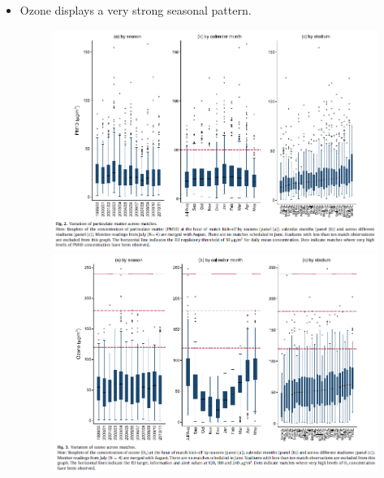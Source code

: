 \documentclass[../root]{subfiles}
\begin{document}
\begin{itemize}
\begin{itemize}
\begin{itemize}
          \item stadium-specific trends: reflects population size and density as well as the degree of industrialization.
          \item The critical value of concentration of \SI{50}{\micro g/m^3} is exceeded in about 7\% of the observed matches.
        \end{itemize}
        \item Ozone displays a very strong seasonal pattern.
        \begin{figure}
          \centering
          \includegraphics[scale = 1]{0522tanji/f2}
          \includegraphics[scale = 1]{0522tanji/f3}
          \label{f2}
        \end{figure}
      \end{itemize}
    \end{itemize}
\end{document}
